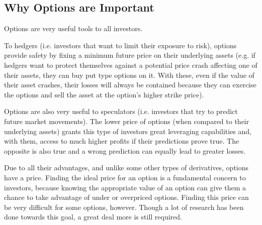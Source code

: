 \subsection{Why Options are Important}
\label{subsection:why options are important}
Options are very useful tools to all investors. 

To hedgers (i.e. investors that want to limit their exposure to risk), options provide safety by fixing a minimum future price on their underlying assets (e.g. if hedgers want to protect themselves against a potential price crash affecting one of their assets, they can buy put type options on it. With these, even if the value of their asset crashes, their losses will always be contained because they can exercise the options and sell the asset at the option's higher strike price).

Options are also very useful to speculators (i.e. investors that try to predict future market movements). The lower price of options (when compared to their underlying assets) grants this type of investors great leveraging capabilities and, with them, access to much higher profits if their predictions prove true. The opposite is also true and a wrong prediction can equally lead to greater losses.

Due to all their advantages, and unlike some other types of derivatives, options have a price. Finding the ideal price for an option is a fundamental concern to investors, because knowing the appropriate value of an option can give them a chance to take advantage of under or overpriced options.
Finding this price can be very difficult for some options, however. Though a lot of research has been done towards this goal, a great deal more is still required.

